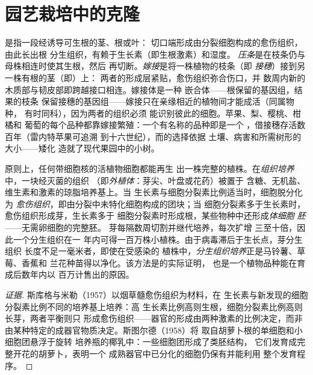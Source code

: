 \section{园艺栽培中的克隆}

\begin{proposition}[扦插、压条与嫁接]\label{prop:b2:asexual-reproduction:horticulture}
\emph{}是指一段经诱导可生根的茎、根或叶：
切口端形成由分裂细胞构成的愈伤组织，由此长出根
分生组织，有赖于生长素（即生根激素）和湿度。
\emph{压条}是在枝条仍与母株相连时使其生根，然后
再切断。\emph{嫁接}是将一株植物的枝条（即
\emph{接穗}）接到另一株有根的茎（即\emph{}）上：
两者的形成层紧贴，愈伤组织弥合伤口，并
数周内新的木质部与韧皮部即跨越接口相连。嫁接体是一种
嵌合体——根保留的基因组，结果的枝条
保留接穗的基因组——嫁接只在亲缘相近的植物间才能成活（同属物种，
有时同科），因为两者的组织必须
能识别彼此的细胞。苹果、梨、樱桃、柑橘和
葡萄的每个品种都靠嫁接繁殖：一个有名称的品种即是一个
，借接穗存活数百年（雷内特苹果可追溯
到十六世纪），而的选择依据
土壤、病害和所需树形的大小——矮化
造就了现代果园中的小树。
\end{proposition}

\begin{proposition}[微繁殖与全能性]\label{prop:b2:asexual-reproduction:tissueculture}
原则上，任何带细胞核的活植物细胞都能再生
出一株完整的植株。在\emph{组织培养}中，一块经灭菌的组织
（即\emph{外植体}：芽尖、叶盘或花药）被置于
含糖、无机盐、维生素和激素的琼脂培养基上。当
生长素与细胞分裂素比例适当时，细胞脱分化为
\emph{愈伤组织}，即由分裂中未特化细胞构成的团块；当
细胞分裂素多于生长素时，愈伤组织形成芽，生长素多于
细胞分裂素时形成根，某些物种中还形成\emph{体细胞
胚}——无需卵细胞的完整胚。
芽每隔数周切割并继代培养，每次扩增
三至十倍，因此一个分生组织在一
年内可得一百万株小植株。由于病毒滞后于生长点，芽分生组织
长度不足一毫米者，即使在受感染的
植株中，\emph{分生组织培养}正是马铃薯、草莓、香蕉和
兰花种苗得以净化。该方法是的实际证明，
也是一个植物品种能在育成后数年内以
百万计售出的原因。
\end{proposition}
\begin{proof}[证据]
斯库格与米勒（1957）以烟草髓愈伤组织为材料，在
生长素与新发现的细胞分裂素比例不同的培养基上培养：高
生长素比例高则生根，细胞分裂素比例高则长芽，两者平衡则只
形成愈伤组织——器官的形成由两种激素的比例决定，而非
由某种特定的成器官物质决定。斯图尔德（1958）将
取自胡萝卜根的单细胞和小细胞团悬浮于旋转
培养瓶的椰乳中：一些细胞团形成了类胚结构，
它们发育成完整开花的胡萝卜，表明一个
成熟器官中已分化的细胞仍保有并能利用
整个发育程序。
\end{proof}

